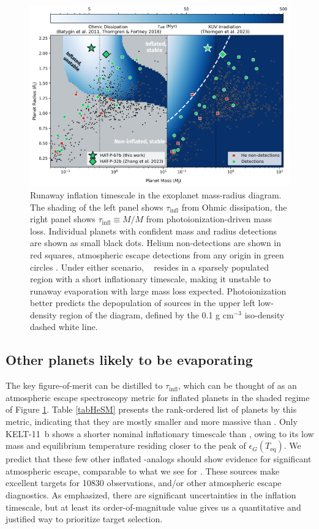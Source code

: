 \documentclass[twocolumn]{aastex631}
\newcommand{\hatpb}{\object{HAT-P-67 b}}
\begin{document}
\begin{figure}[t]
    \includegraphics[width=\linewidth]{figures/thorn2023_theory.png}
    \caption{Runaway inflation timescale in the exoplanet mass-radius diagram.  The shading of the left panel shows $\tau_\mathrm{infl}$ from Ohmic dissipation, the right panel shows $\tau_\mathrm{infl}\equiv M/\dot{M}$ from photoionization-driven mass loss.  Individual planets with confident mass and radius detections are shown as small black dots. Helium non-detections are shown in red squares, atmospheric escape detections from any origin in green circles \citep{2022arXiv221116243D}.  Under either scenario, \hatpb~ resides in a sparsely populated region with a short inflationary timescale, making it unstable to runaway evaporation with large mass loss expected.  Photoionization better predicts the depopulation of sources in the upper left low-density region of the diagram, defined by the 0.1 g cm$^{-3}$ iso-density dashed white line.}
    \label{fig:tf2018_theory}
\end{figure}


\subsection{Other planets likely to be evaporating}

The key figure-of-merit can be distilled to $\tau_\mathrm{infl}$, which can be thought of as an atmospheric escape spectroscopy metric \citep{2018PASP..130k4401K} for inflated planets in the shaded regime of Figure \ref{fig:tf2018_theory}.  Table \ref{tabHeSM} presents the rank-ordered list of planets by this metric, indicating that they are mostly smaller and more massive than \hatpb.  Only KELT-11~b shows a shorter nominal inflationary timescale than \hatpb, owing to its low mass and equilibrium temperature residing closer to the peak of $\epsilon_G(T_\mathrm{eq})$.  We predict that these few other inflated \hatpb-analogs should show evidence for significant atmospheric escape, comparable to what we see for \hatpb.  These sources make excellent targets for  10830 observations, and/or other atmospheric escape diagnostics.  As emphasized, there are significant uncertainties in the inflation timescale, but at least its order-of-magnitude value gives us a quantitative and justified way to prioritize target selection.
\end{document}

